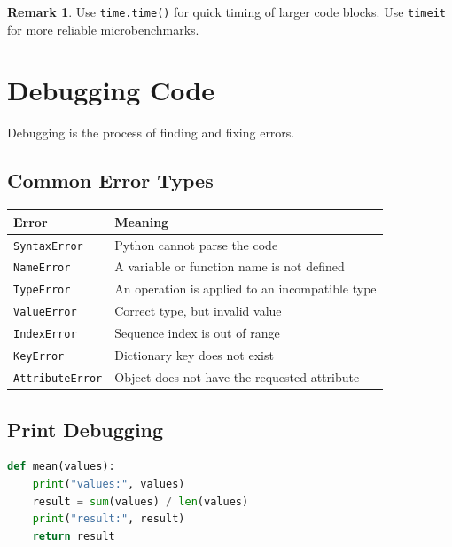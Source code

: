 \documentclass[12pt,oneside]{book}
\numberwithin{equation}{section}
\theoremstyle{definition}
\newtheorem{remark}{Remark}[section]
\theoremstyle{plain}
\theoremstyle{remark}
\begin{document}
\begin{remark}
Use \texttt{time.time()} for quick timing of larger code blocks. Use \texttt{timeit} for more reliable microbenchmarks.
\end{remark}

\section{Debugging Code}

Debugging is the process of finding and fixing errors.

\subsection{Common Error Types}

\begin{center}
\begin{xltabular}{\textwidth}{>{\raggedright\arraybackslash}p{0.25\textwidth}
>{\raggedright\arraybackslash}X}
\toprule
Error & Meaning \\
\midrule
\texttt{SyntaxError} & Python cannot parse the code \\

\texttt{NameError} & A variable or function name is not defined \\

\texttt{TypeError} & An operation is applied to an incompatible type \\

\texttt{ValueError} & Correct type, but invalid value \\

\texttt{IndexError} & Sequence index is out of range \\

\texttt{KeyError} & Dictionary key does not exist \\

\texttt{AttributeError} & Object does not have the requested attribute \\
\bottomrule
\end{xltabular}
\end{center}

\subsection{Print Debugging}

\begin{lstlisting}[language=Python]
def mean(values):
    print("values:", values)
    result = sum(values) / len(values)
    print("result:", result)
    return result
\end{lstlisting}
\end{document}

